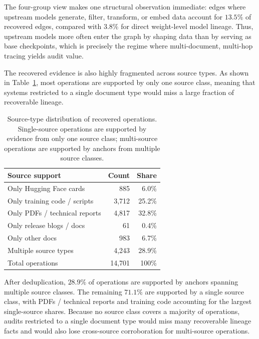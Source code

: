 \noindent
The four-group view makes one structural observation immediate: edges where upstream models generate, filter, transform, or embed data account for $13.5\%$ of recovered edges, compared with $3.8\%$ for direct weight-level model lineage. Thus, upstream models more often enter the graph by shaping data than by serving as base checkpoints, which is precisely the regime where multi-document, multi-hop tracing yields audit value.

The recovered evidence is also highly fragmented across source types. As shown in Table~\ref{tab:source-type-distribution}, most operations are supported by only one source class, meaning that systems restricted to a single document type would miss a large fraction of recoverable lineage.

\begin{table}[t]
\centering
\small
\caption{Source-type distribution of recovered operations. Single-source operations are supported by evidence from only one source class; multi-source operations are supported by anchors from multiple source classes.}
\label{tab:source-type-distribution}
\begin{tabular}{lrr}
\toprule
Source support & Count & Share \\
\midrule
Only Hugging Face cards & 885 & 6.0\% \\
Only training code / scripts & 3,712 & 25.2\% \\
Only PDFs / technical reports & 4,817 & 32.8\% \\
Only release blogs / docs & 61 & 0.4\% \\
Only other docs & 983 & 6.7\% \\
Multiple source types & 4,243 & 28.9\% \\
\midrule
Total operations & 14,701 & 100\% \\
\bottomrule
\end{tabular}
\end{table}

\noindent
After deduplication, $28.9\%$ of operations are supported by anchors spanning multiple source classes. The remaining $71.1\%$ are supported by a single source class, with PDFs / technical reports and training code accounting for the largest single-source shares. Because no source class covers a majority of operations, audits restricted to a single document type would miss many recoverable lineage facts and would also lose cross-source corroboration for multi-source operations.
